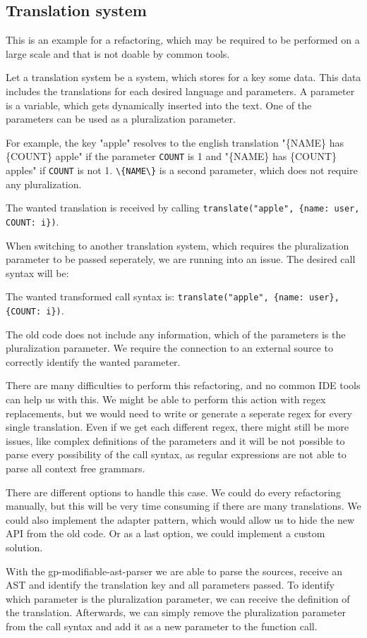 
\subsection{Translation system}

This is an example for a refactoring, which may be required to be performed on a large scale and that is not doable by common tools.

Let a translation system be a system, which stores for a key some data. This data includes the translations for each desired language and parameters.
A parameter is a variable, which gets dynamically inserted into the text. One of the parameters can be used as a pluralization parameter.

For example, the key "apple" resolves to the english translation "\{NAME\} has \{COUNT\} apple" if the parameter \verb|COUNT| is 1 and "\{NAME\} has \{COUNT\} apples" if \verb|COUNT| is not 1.
\verb|\{NAME\}| is a second parameter, which does not require any pluralization.

The wanted translation is received by calling \verb|translate("apple", {name: user, COUNT: i})|.

When switching to another translation system, which requires the pluralization parameter to be passed seperately, we are running into an issue. 
The desired call syntax will be:

The wanted transformed call syntax is: \verb|translate("apple", {name: user}, {COUNT: i})|.

The old code does not include any information, which of the parameters is the pluralization parameter. 
We require the connection to an external source to correctly identify the wanted parameter.

There are many difficulties to perform this refactoring, and no common IDE tools can help us with this.
We might be able to perform this action with regex replacements, but we would need to write or generate a seperate regex for every single translation.
Even if we get each different regex, there might still be more issues, like complex definitions of the parameters and it will be not possible to 
parse every possibility of the call syntax, as regular expressions are not able to parse all context free grammars.

There are different options to handle this case. We could do every refactoring manually, but this will be very time consuming if there are many translations.
We could also implement the adapter pattern, which would allow us to hide the new API from the old code. Or as a last option, we could implement a custom solution.

With the gp-modifiable-ast-parser we are able to parse the sources, receive an AST and identify the translation key and all parameters passed.
To identify which parameter is the pluralization parameter, we can receive the definition of the translation. Afterwards, we can simply remove the pluralization parameter
from the call syntax and add it as a new parameter to the function call.